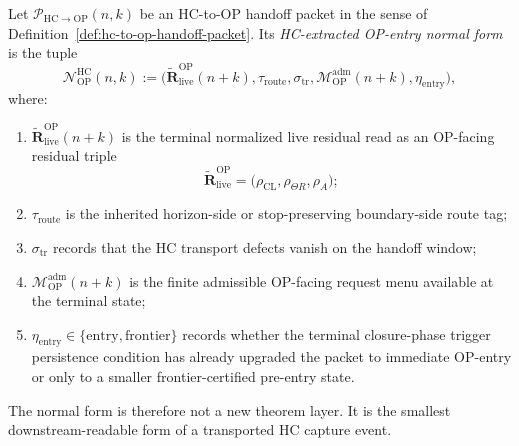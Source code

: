 \begin{definition}
\label{def:hc-extracted-op-entry-normal-form}
Let $\mathcal P_{\mathrm{HC}\to\mathrm{OP}}(n,k)$ be an HC-to-OP handoff packet in the sense of Definition~\ref{def:hc-to-op-handoff-packet}. Its \emph{HC-extracted OP-entry normal form} is the tuple
\[
 \mathcal N_{\mathrm{OP}}^{\mathrm{HC}}(n,k)
 :=
 \bigl(
 \widetilde{\mathbf R}_{\mathrm{live}}^{\mathrm{OP}}(n+k),
 \tau_{\mathrm{route}},
 \sigma_{\mathrm{tr}},
 \mathcal M_{\mathrm{OP}}^{\mathrm{adm}}(n+k),
 \eta_{\mathrm{entry}}
 \bigr),
\]
where:
\begin{enumerate}[leftmargin=2em,label=(\alph*)]
 \item $\widetilde{\mathbf R}_{\mathrm{live}}^{\mathrm{OP}}(n+k)$ is the terminal normalized live residual read as an OP-facing residual triple
 \[
 \widetilde{\mathbf R}_{\mathrm{live}}^{\mathrm{OP}}
 =
 \bigl(\rho_{\mathrm{CL}},\rho_{\Theta R},\rho_A\bigr);
 \]
 \item $\tau_{\mathrm{route}}$ is the inherited horizon-side or stop-preserving boundary-side route tag;
 \item $\sigma_{\mathrm{tr}}$ records that the HC transport defects vanish on the handoff window;
 \item $\mathcal M_{\mathrm{OP}}^{\mathrm{adm}}(n+k)$ is the finite admissible OP-facing request menu available at the terminal state;
 \item $\eta_{\mathrm{entry}}\in\{\mathrm{entry},\mathrm{frontier}\}$ records whether the terminal closure-phase trigger persistence condition has already upgraded the packet to immediate OP-entry or only to a smaller frontier-certified pre-entry state.
\end{enumerate}
The normal form is therefore not a new theorem layer. It is the smallest downstream-readable form of a transported HC capture event.
\end{definition}

